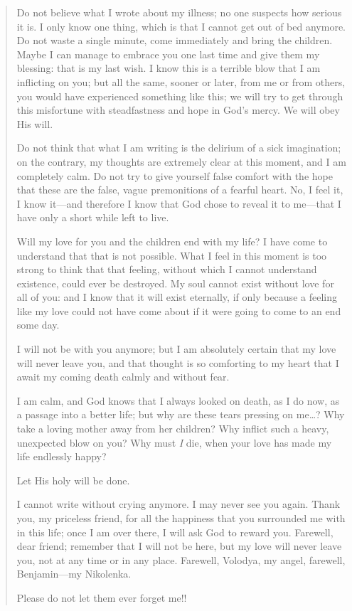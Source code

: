 \begin{quotation}
Do not believe what I wrote about my illness; no one suspects how serious it is. I only know one thing, which is that I cannot get out of bed anymore. Do not waste a single minute, come immediately and bring the children. Maybe I can manage to embrace you one last time and give them my blessing: that is my last wish. I know this is a terrible blow that I am inflicting on you; but all the same, sooner or later, from me or from others, you would have experienced something like this; we will try to get through this misfortune with steadfastness and hope in God's mercy. We will obey His will.

Do not think that what I am writing is the delirium of a sick imagination; on the contrary, my thoughts are extremely clear at this moment, and I am completely calm. Do not try to give yourself false comfort with the hope that these are the false, vague premonitions of a fearful heart. No, I feel it, I know it---and therefore I know that God chose to reveal it to me---that I have only a short while left to live.

Will my love for you and the children end with my life? I have come to understand that that is not possible. What I feel in this moment is too strong to think that that feeling, without which I cannot understand existence, could ever be destroyed. My soul cannot exist without love for all of you: and I know that it will exist eternally, if only because a feeling like my love could not have come about if it were going to come to an end some day.

I will not be with you anymore; but I am absolutely certain that my love will never leave you, and that thought is so comforting to my heart that I await my coming death calmly and without fear.

I am calm, and God knows that I always looked on death, as I do now, as a passage into a better life; but why are these tears pressing on me\ldots{}? Why take a loving mother away from her children? Why inflict such a heavy, unexpected blow on you? Why must \emph{I} die, when your love has made my life endlessly happy?

Let His holy will be done.

I cannot write without crying anymore. I may never see you again. Thank you, my priceless friend, for all the happiness that you surrounded me with in this life; once I am over there, I will ask God to reward you. Farewell, dear friend; remember that I will not be here, but my love will never leave you, not at any time or in any place. Farewell, Volodya, my angel, farewell, Benjamin---my Nikolenka.

Please do not let them ever forget me!!
\end{quotation}

